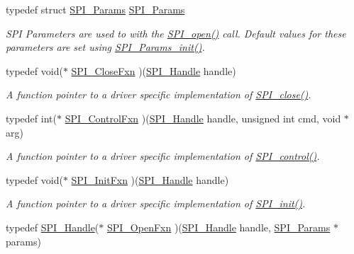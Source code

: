 \begin{DoxyCompactItemize}
typedef struct \hyperlink{struct_s_p_i___params}{S\-P\-I\-\_\-\-Params} \hyperlink{_s_p_i_8h_ae69b175346a856bdbb4ee6ed46b59a2f}{S\-P\-I\-\_\-\-Params}
\begin{DoxyCompactList}\small\item\em S\-P\-I Parameters are used to with the \hyperlink{_s_p_i_8h_a62cfe494cb1df47cd602e8747e894fd1}{S\-P\-I\-\_\-open()} call. Default values for these parameters are set using \hyperlink{_s_p_i_8h_a9c3dd1748332fd6e31c79a6538a71642}{S\-P\-I\-\_\-\-Params\-\_\-init()}. \end{DoxyCompactList}\item 
typedef void($\ast$ \hyperlink{_s_p_i_8h_a00416f189f122a27ca351da651dbfbd5}{S\-P\-I\-\_\-\-Close\-Fxn} )(\hyperlink{_s_p_i_8h_a728806534c3c3e8675cfbfb7d8e36f13}{S\-P\-I\-\_\-\-Handle} handle)
\begin{DoxyCompactList}\small\item\em A function pointer to a driver specific implementation of \hyperlink{_s_p_i_8h_a0e3448b30b88609fa120915e49560601}{S\-P\-I\-\_\-close()}. \end{DoxyCompactList}\item 
typedef int($\ast$ \hyperlink{_s_p_i_8h_a0796d80d841b833b08743785646288af}{S\-P\-I\-\_\-\-Control\-Fxn} )(\hyperlink{_s_p_i_8h_a728806534c3c3e8675cfbfb7d8e36f13}{S\-P\-I\-\_\-\-Handle} handle, unsigned int cmd, void $\ast$arg)
\begin{DoxyCompactList}\small\item\em A function pointer to a driver specific implementation of \hyperlink{_s_p_i_8h_ab9d3a23991be2741f382749d3844cc2f}{S\-P\-I\-\_\-control()}. \end{DoxyCompactList}\item 
typedef void($\ast$ \hyperlink{_s_p_i_8h_ab316f5bfe00febe920ebe27021f47916}{S\-P\-I\-\_\-\-Init\-Fxn} )(\hyperlink{_s_p_i_8h_a728806534c3c3e8675cfbfb7d8e36f13}{S\-P\-I\-\_\-\-Handle} handle)
\begin{DoxyCompactList}\small\item\em A function pointer to a driver specific implementation of \hyperlink{_s_p_i_8h_afd9b09f58917f0e2d14c61b956eba214}{S\-P\-I\-\_\-init()}. \end{DoxyCompactList}\item 
typedef \hyperlink{_s_p_i_8h_a728806534c3c3e8675cfbfb7d8e36f13}{S\-P\-I\-\_\-\-Handle}($\ast$ \hyperlink{_s_p_i_8h_a4968bfeca9b1f3713355a78e88679570}{S\-P\-I\-\_\-\-Open\-Fxn} )(\hyperlink{_s_p_i_8h_a728806534c3c3e8675cfbfb7d8e36f13}{S\-P\-I\-\_\-\-Handle} handle, \hyperlink{struct_s_p_i___params}{S\-P\-I\-\_\-\-Params} $\ast$params)

\end{DoxyCompactItemize}
